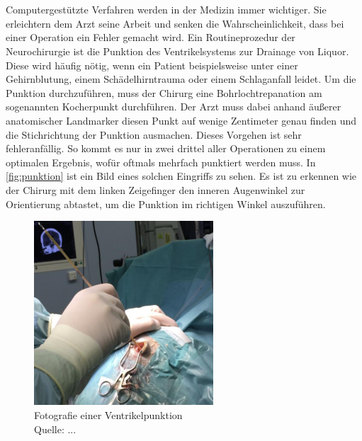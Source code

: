 \chapter{}
\label{sec:Introduction}



Computergestützte Verfahren werden in der Medizin immer wichtiger. Sie erleichtern dem Arzt seine Arbeit und senken die Wahrscheinlichkeit, dass bei einer Operation ein Fehler gemacht wird.
\newline
Ein Routineprozedur der Neurochirurgie ist die Punktion des Ventrikelsystems zur Drainage von Liquor. Diese wird häufig nötig, wenn ein Patient beispielsweise unter einer Gehirnblutung, einem Schädelhirntrauma oder einem Schlaganfall leidet.
\newline
Um die Punktion durchzuführen, muss der Chirurg eine Bohrlochtrepanation am sogenannten Kocherpunkt durchführen. Der Arzt muss dabei anhand äußerer anatomischer Landmarker diesen Punkt auf wenige Zentimeter genau finden und die Stichrichtung der Punktion ausmachen.
\newline
Dieses Vorgehen ist sehr fehleranfällig. So kommt es nur in zwei drittel aller Operationen zu einem optimalen Ergebnis, wofür oftmals mehrfach punktiert werden muss.
\newline
In \autoref{fig:punktion} ist ein Bild eines solchen Eingriffs zu sehen. Es ist zu erkennen wie der Chirurg mit dem linken Zeigefinger den inneren Augenwinkel zur Orientierung abtastet, um die Punktion im richtigen Winkel auszuführen.


\begin{figure}[!h] 
\centering 
\includegraphics[width=0.6\textwidth]{Logos/Punktion2.png}
\caption{Fotografie einer Ventrikelpunktion  \\Quelle: ...} 
\label{fig:punktion} 
\end{figure}



